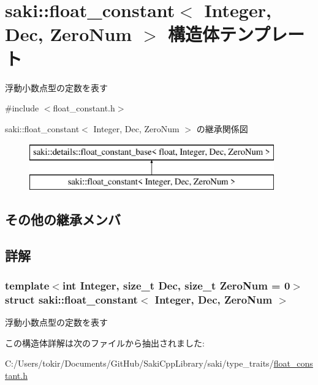 \hypertarget{structsaki_1_1float__constant}{}\section{saki\+:\+:float\+\_\+constant$<$ Integer, Dec, Zero\+Num $>$ 構造体テンプレート}
\label{structsaki_1_1float__constant}


浮動小数点型の定数を表す  




{\ttfamily \#include $<$float\+\_\+constant.\+h$>$}

saki\+:\+:float\+\_\+constant$<$ Integer, Dec, Zero\+Num $>$ の継承関係図\begin{figure}[H]
\begin{center}
\leavevmode
\includegraphics[height=2.000000cm]{structsaki_1_1float__constant}
\end{center}
\end{figure}
\subsection*{その他の継承メンバ}


\subsection{詳解}
\subsubsection*{template$<$int Integer, size\+\_\+t Dec, size\+\_\+t Zero\+Num = 0$>$\newline
struct saki\+::float\+\_\+constant$<$ Integer, Dec, Zero\+Num $>$}

浮動小数点型の定数を表す 

この構造体詳解は次のファイルから抽出されました\+:\begin{DoxyCompactItemize}
\item 
C\+:/\+Users/tokir/\+Documents/\+Git\+Hub/\+Saki\+Cpp\+Library/saki/type\+\_\+traits/\mbox{\hyperlink{float__constant_8h}{float\+\_\+constant.\+h}}\end{DoxyCompactItemize}

